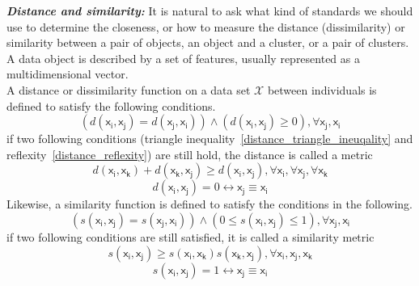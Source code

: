 \textbf{\textit{Distance and similarity:}}
It is natural to ask what kind of standards we should use to determine the closeness, or how to measure the distance (dissimilarity) or similarity between a pair of objects, an object and a cluster, or a pair of clusters. A data object is described by a set of features, usually represented as a multidimensional vector. 
\\A distance or dissimilarity function on a data set $\mathcal{X}$ between individuals is defined to satisfy the following conditions.
\begin{equation}
     (d(\mathsf{x_i},\mathsf{x_j}) = d(\mathsf{x_j},\mathsf{x_i})) 
     \wedge
     (d(\mathsf{x_i},\mathsf{x_j}) \geq 0), \forall \mathsf{x_j},\mathsf{x_i}
\end{equation}
if two following conditions (triangle inequality~\ref{distance_triangle_ineuqality} and reflexity~\ref{distance_reflexity}) are still hold, the distance is called a metric
\begin{equation}
     d(\mathsf{x_i},\mathsf{x_k}) + d(\mathsf{x_k},\mathsf{x_j}) \geq d(\mathsf{x_i},\mathsf{x_j}), 
     \forall \mathsf{x_i},\forall\mathsf{x_j},\forall\mathsf{x_k}
     \label{distance_triangle_ineuqality}
\end{equation}
\begin{equation}
     d(\mathsf{x_i},\mathsf{x_j}) = 0 \leftrightarrow \mathsf{x_j}\equiv \mathsf{x_i} 
     \label{distance_reflexity}
\end{equation}
Likewise, a similarity function is defined to satisfy the conditions in the following.
\begin{equation}
     (s(\mathsf{x_i},\mathsf{x_j}) = s(\mathsf{x_j},\mathsf{x_i})) 
     \wedge
     (0 \leq s(\mathsf{x_i},\mathsf{x_j}) \leq 1), \forall \mathsf{x_j},\mathsf{x_i}
\end{equation}
if two following conditions are still satisfied, it is called a similarity metric
\begin{equation}
     [s(\mathsf{x_i},\mathsf{x_k}) + s(\mathsf{x_k},\mathsf{x_j})]s(\mathsf{x_i},\mathsf{x_j}) \geq s(\mathsf{x_i},\mathsf{x_k})s(\mathsf{x_k},\mathsf{x_j}), 
     \forall \mathsf{x_i},\mathsf{x_j},\mathsf{x_k}
\end{equation}
\begin{equation}
     s(\mathsf{x_i},\mathsf{x_j}) = 1 \leftrightarrow \mathsf{x_j}\equiv \mathsf{x_i} 
\end{equation}
